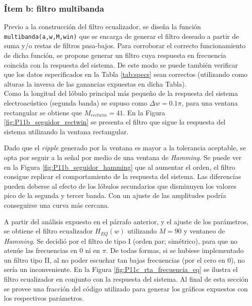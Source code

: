 	\subsubsection{Ítem b: filtro multibanda}

	Previo a la construcción del filtro ecualizador, se diseña la función \texttt{multibanda(a,w,M,win)} que se encarga de generar el filtro deseado a partir de suma y/o restas de filtros pasa-bajos. Para corroborar el correcto funcionamiento de dicha función, se propone generar un filtro cuya respuesta en frecuencia coincida con la respuesta del sistema. De este modo se puede también verificar que los datos especificados en la Tabla \ref{tab:specs} sean correctos (utilizando como alturas la inversa de las ganancias expuestas en dicha Tabla).\\

	Como la longitud del lóbulo principal más pequeño de la respuesta del sistema electroacústico (segunda banda) se supuso como $\Delta w = 0.1\pi$, para una ventana rectangular se obtiene que $M_{rectwin}=41$. En la Figura \ref{fig:P11b_seguidor_rectwin} se presenta el filtro que sigue la respuesta del sistema utilizando la ventana rectangular. 
	
	Dado que el \emph{ripple} generado por la ventana es mayor a la tolerancia aceptable, se opta por seguir a la señal por medio de una ventana de \emph{Hamming}. Se puede ver en la Figura \ref{fig:P11b_seguidor_hamming} que al aumentar el orden, el filtro consigue replicar el comportamiento de la respuesta del sistema. Las diferencias pueden deberse al efecto de los lóbulos secundarios que disminuyen los valores pico de la segunda y tercer banda. Con un ajuste de las amplitudes podría conseguirse una curva más cercana.\\
	
	

	\pagebreak
	A partir del análisis expuesto en el párrafo anterior, y el ajuste de los parámetros, se obtiene el filtro ecualizador $H_{EQ}(w)$ utilizando $M=90$ y ventaneo de \emph{Hamming}. Se decidió por el filtro de tipo I (orden par; simétrico), para que no atenúe las frecuencias en $0$ ni en $\pi$. 
	De todas formas, si se hubiese implementado un filtro tipo II, al no poder escuchar tan bajas frecuencias (por el cero en 0), no sería un inconveniente.
	En la Figura \ref{fig:P11c_rta_frecuencia_eq} se ilustra el filtro ecualizador en conjunto con la respuesta del sistema. Al final de esta sección se provee una fracción del código utilizado para generar los gráficos expuestos con los respectivos parámetros.	

